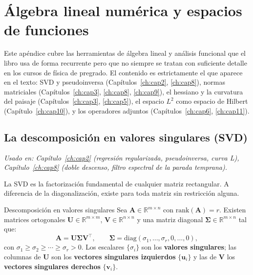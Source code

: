\chapter{Álgebra lineal numérica y espacios de funciones}
\label{ap:algebra_lineal}

Este apéndice cubre las herramientas de álgebra lineal y análisis funcional que
el libro usa de forma recurrente pero que no siempre se tratan con suficiente
detalle en los cursos de física de pregrado. El contenido es estrictamente el
que aparece en el texto: SVD y pseudoinversa (Capítulos~\ref{ch:cap2},
\ref{ch:cap8}), normas matriciales (Capítulos~\ref{ch:cap3}, \ref{ch:cap8},
\ref{ch:cap9}), el hessiano y la curvatura del paisaje
(Capítulos~\ref{ch:cap3}, \ref{ch:cap5}), el espacio $L^2$ como espacio de
Hilbert (Capítulo~\ref{ch:cap10}), y los operadores adjuntos
(Capítulos~\ref{ch:cap6}, \ref{ch:cap11}).

\section{La descomposición en valores singulares (SVD)}
\label{sec:ap_svd}

\textit{Usado en: Capítulo~\ref{ch:cap2} (regresión regularizada, pseudoinversa,
curva L), Capítulo~\ref{ch:cap8} (doble descenso, filtro espectral de la parada
temprana).}

\medskip
La SVD es la factorización fundamental de cualquier matriz rectangular. A
diferencia de la diagonalización, existe para toda matriz sin restricción alguna.

\begin{teorema}{Descomposición en valores singulares}
\label{thm:ap_svd}
Sea $\bm{A}\in\mathbb{R}^{m\times n}$ con $\mathrm{rank}(\bm{A}) = r$. Existen
matrices ortogonales $\bm{U}\in\mathbb{R}^{m\times m}$, $\bm{V}\in\mathbb{R}^{n\times n}$
y una matriz diagonal $\bm{\Sigma}\in\mathbb{R}^{m\times n}$ tal que:
\begin{equation}
  \bm{A} = \bm{U}\bm{\Sigma}\bm{V}^\top,
  \qquad
  \bm{\Sigma} = \mathrm{diag}(\sigma_1,\ldots,\sigma_r,0,\ldots,0),
  \label{eq:ap_svd}
\end{equation}
con $\sigma_1 \geq \sigma_2 \geq \cdots \geq \sigma_r > 0$. Los escalares
$\{\sigma_i\}$ son los \textbf{valores singulares}; las columnas de $\bm{U}$
son los \textbf{vectores singulares izquierdos} $\{\bm{u}_i\}$ y las de
$\bm{V}$ los \textbf{vectores singulares derechos} $\{\bm{v}_i\}$.
\end{teorema}

